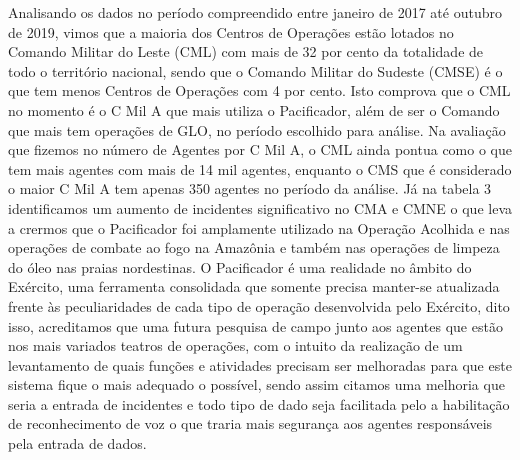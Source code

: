 Analisando os dados no período compreendido entre janeiro de 2017 até outubro de 2019, vimos que a maioria dos Centros de Operações estão lotados no Comando Militar do Leste (CML) com mais de 32 por cento da totalidade de todo o território nacional, sendo que o Comando Militar do Sudeste (CMSE) é o que tem menos Centros de Operações com 4 por cento. Isto comprova que o CML no momento é o C Mil A que mais utiliza o Pacificador, além de ser o Comando que mais tem operações de GLO, no período escolhido para análise.
Na avaliação que fizemos no número de Agentes por C Mil A, o CML ainda pontua como o que tem mais agentes com mais de 14 mil agentes, enquanto o CMS que é considerado o maior C Mil A tem apenas 350 agentes no período da análise.
Já na tabela 3 identificamos um aumento de incidentes significativo no CMA e CMNE o que leva a crermos que o Pacificador foi amplamente utilizado na Operação Acolhida e nas operações de combate ao fogo na Amazônia e também nas operações de limpeza do óleo nas praias nordestinas.
O Pacificador é uma realidade no âmbito do Exército, uma ferramenta consolidada que somente precisa manter-se atualizada frente às peculiaridades de cada tipo de operação desenvolvida pelo Exército, dito isso, acreditamos que uma futura pesquisa de campo junto aos agentes que estão nos mais variados teatros de operações, com o intuito da realização de um levantamento de quais funções e atividades precisam ser melhoradas para que este sistema fique o mais adequado o possível, sendo assim citamos uma melhoria que seria a entrada de incidentes e todo tipo de dado seja facilitada pelo a habilitação de reconhecimento de voz o que traria mais segurança aos agentes responsáveis pela entrada de dados.


